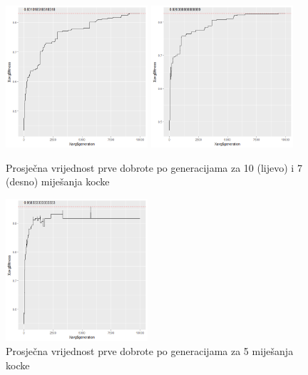 \documentclass[times, utf8, seminar, numeric]{fer}
\begin{document}
  		\begin{figure}[ht!]
			\centering
			\includegraphics[width=0.47\textwidth]{../results/sumsides_fitness/10_scrambles/cross0,5greedy10mut20.png}
			\includegraphics[width=0.47\textwidth]{../results/sumsides_fitness/7_scrambles/cross0,5greedy10mut20.png}
			\caption{Prosječna vrijednost prve dobrote po generacijama za 10 (lijevo) i 7 (desno) miješanja kocke }
		\end{figure}
		
  		\begin{figure}[ht!]
			\centering
			\includegraphics[width=0.47\textwidth]{../results/sumsides_fitness/5_scrambles/cross0,5greedy10mut20.png}
			\caption{Prosječna vrijednost prve dobrote po generacijama za 5 miješanja kocke }
		\end{figure}
\end{document}
